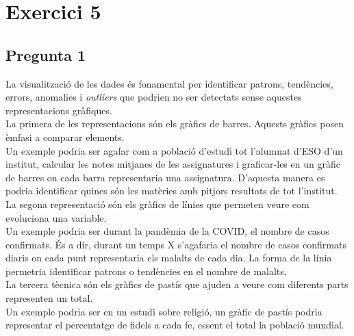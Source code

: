 \documentclass[a4paper,12pt]{report}
\begin{document}
\section*{Exercici 5}
\subsection*{Pregunta 1}
La visualització de les dades és fonamental per identificar patrons, tendències, errors, anomalies i \textit{outliers} que podrien no ser detectats sense aquestes representacions gràfiques.\\
La primera de les representacions són els gràfics de barres. Aquests gràfics posen èmfasi a comparar elements.\\
Un exemple podria ser agafar com a població d'estudi tot l'alumnat d'ESO d'un institut, calcular les notes mitjanes de les assignatures i graficar-les en un gràfic de barres on cada barra representaria una assignatura. D'aquesta manera es podria identificar quines són les matèries amb pitjors resultats de tot l'institut.\\
La segona representació són els gràfics de línies que permeten veure com evoluciona una variable.\\
Un exemple podria ser durant la pandèmia de la COVID, el nombre de casos confirmats. És a dir, durant un temps X s'agafaria el nombre de casos confirmats diaris on cada punt representaria els malalts de cada dia. La forma de la línia permetria identificar patrons o tendències en el nombre de malalts.\\
La tercera tècnica són els gràfics de pastís que ajuden a veure com diferents parts representen un total.\\
Un exemple podria ser en un estudi sobre religió, un gràfic de pastís podria representar el percentatge de fidels a cada fe, essent el total la població mundial.
\end{document}
